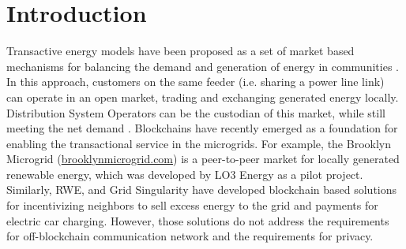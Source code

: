 \section{Introduction}


Transactive energy models have been proposed as a set of market based mechanisms for balancing the demand and generation of energy in communities \cite{kok2016society,cox2013structured,melton2013gridwise}.
 In this approach, customers on the same feeder (i.e. sharing a power line link) can operate in an open market, trading and exchanging generated energy locally. Distribution System Operators can be the custodian of this market, while still meeting the net demand \cite{7462854}. Blockchains have  recently emerged as a foundation for enabling the transactional service in the microgrids. For example, the Brooklyn Microgrid
(\url{brooklynmicrogrid.com}) is a peer-to-peer market for locally
generated renewable energy, which was developed by LO3 Energy as a pilot project. Similarly, RWE, and Grid Singularity have developed blockchain based solutions for incentivizing neighbors to sell excess energy to the grid and payments for electric car charging. %
However, those solutions do not address the requirements for off-blockchain communication network and the requirements for privacy. 
 
 
 
 

